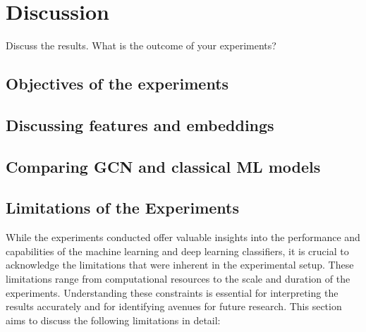 \chapter{Discussion}\label{chap:discussion}

Discuss the results. What is the outcome of your experiments?

\section{Objectives of the experiments}

\section{Discussing features and embeddings}

\section{Comparing GCN and classical ML models}

\section{Limitations of the Experiments}

While the experiments conducted offer valuable insights into the performance and capabilities of the machine learning and deep learning classifiers, it is crucial to acknowledge the limitations that were inherent in the experimental setup. These limitations range from computational resources to the scale and duration of the experiments. Understanding these constraints is essential for interpreting the results accurately and for identifying avenues for future research. This section aims to discuss the following limitations in detail:

